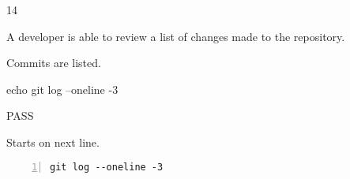 \begin{description}[align=right,leftmargin=3.2cm,labelindent=3.0cm]
\item[Step:] 14
\item[Confirm:] A developer is able to review a list of changes made to the repository.
\item[Expectation:] Commits are listed.
\item[Command:] echo git  log --oneline -3
\item[Test Result:] PASS
\item[Evidence:] Starts on next line.
\end{description}
\begin{lstlisting}[numbers=left]
git log --oneline -3

\end{lstlisting}
